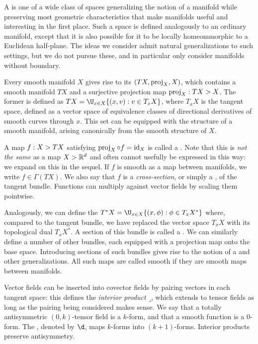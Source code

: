 \documentclass[11pt]{book}
\begin{document}
A  is one of a wide class of spaces generalizing the notion of a manifold while preserving most geometric characteristics that make manifolds useful and interesting in the first place.
Such a space is defined analogously to an ordinary manifold, except that it is also possible for it to be locally homeommorphic to a Euclidean half-plane.
The ideas we consider admit natural generalizations to such settings, but we do not pursue these, and in particular only consider manifolds without boundary.

Every smooth manifold $X$ gives rise to its  $(TX,\operatorname{proj}_X,X)$, which contains a smooth manifold $TX$ and a surjective projection map $\operatorname{proj}_X : TX \-> X$.
The former is defined as $TX = \U_{x\in X} \{(x,v) : v \in T_x X\}$, where $T_x X$ is the tangent space, defined as a vector space of equivalence classes of directional derivatives of smooth curves through $x$.
This set can be equipped with the structure of a smooth manifold, arising canonically from the smooth structure of $X$.

A map $f : X \-> TX$ satisfying $\operatorname{proj}_X \circ f = \operatorname{id}_X$ is called a .
Note that this is \emph{not the same} as a map $X \-> \mathbb{R}^d$ and often cannot usefully be expressed in this way: we expand on this in the sequel.
If $f$ is smooth as a map between manifolds, we write $f \in \Gamma(TX)$.
We also say that $f$ is a \emph{cross-section}, or simply a , of the tangent bundle.
Functions can multiply against vector fields by scaling them pointwise.

Analogously, we can define the  $T^* X = \U_{x\in X} \{(x,\phi) : \phi \in T_x X^*\}$ where, compared to the tangent bundle, we have replaced the vector space $T_x X$ with its topological dual $T_x X^*$.
A section of this bundle is called a .
We can similarly define a number of other bundles, each equipped with a projection map onto the base space.
Introducing sections of such bundles gives rise to the notion of a  and other generalizations.
All such maps are called smooth if they are smooth maps between manifolds.

Vector fields can be inserted into covector fields by pairing vectors in each tangent space: this defines the \emph{interior product} $\mathbin{\lrcorner}$, which extends to tensor fields as long as the pairing being considered makes sense.
We say that a totally antisymmetric $(0,k)$-tensor field is a $k$-form, and that a smooth function is a $0$-form.
The , denoted by $\d$, maps $k$-forms into $(k+1)$-forms.
Interior products preserve antisymmetry.
\end{document}
